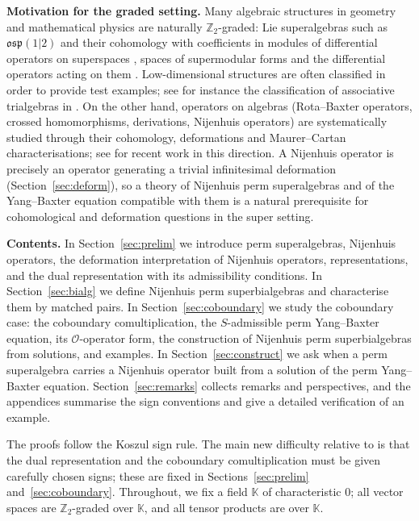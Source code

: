 \documentclass[11pt]{article}
\theoremstyle{definition}
\newcommand{\K}{\mathbb{K}}
\begin{document}
\newpage
\medskip
\noindent\textbf{Motivation for the graded setting.}
Many algebraic structures in geometry and mathematical physics are naturally $\mathbb{Z}_2$-graded: Lie superalgebras such as $\mathfrak{osp}(1|2)$ and their cohomology with coefficients in modules of differential operators on superspaces \cite{bb1}, spaces of supermodular forms and the differential operators acting on them \cite{bbbbk1}. Low-dimensional structures are often classified in order to provide test examples; see for instance the classification of associative trialgebras in \cite{MBZ}. On the other hand, operators on algebras (Rota--Baxter operators, crossed homomorphisms, derivations, Nijenhuis operators) are systematically studied through their cohomology, deformations and Maurer--Cartan characterisations; see \cite{imed-rb,basdouri-crossed,imed-maurer} for recent work in this direction. A Nijenhuis operator is precisely an operator generating a trivial infinitesimal deformation (Section~\ref{sec:deform}), so a theory of Nijenhuis perm superalgebras and of the Yang--Baxter equation compatible with them is a natural prerequisite for cohomological and deformation questions in the super setting.


\medskip
\noindent\textbf{Contents.}
In Section~\ref{sec:prelim} we introduce perm superalgebras, Nijenhuis operators, the deformation interpretation of Nijenhuis operators, representations, and the dual representation with its admissibility conditions. In Section~\ref{sec:bialg} we define Nijenhuis perm superbialgebras and characterise them by matched pairs. In Section~\ref{sec:coboundary} we study the coboundary case: the coboundary comultiplication, the $S$-admissible perm Yang--Baxter equation, its $\mathcal O$-operator form, the construction of Nijenhuis perm superbialgebras from solutions, and examples. In Section~\ref{sec:construct} we ask when a perm superalgebra carries a Nijenhuis operator built from a solution of the perm Yang--Baxter equation. Section~\ref{sec:remarks} collects remarks and perspectives, and the appendices summarise the sign conventions and give a detailed verification of an example.

The proofs follow the Koszul sign rule. The main new difficulty relative to \cite{MS} is that the dual representation and the coboundary comultiplication must be given carefully chosen signs; these are fixed in Sections~\ref{sec:prelim} and~\ref{sec:coboundary}. Throughout, we fix a field $\K$ of characteristic $0$; all vector spaces are $\mathbb{Z}_2$-graded over $\K$, and all tensor products are over $\K$.
\end{document}
